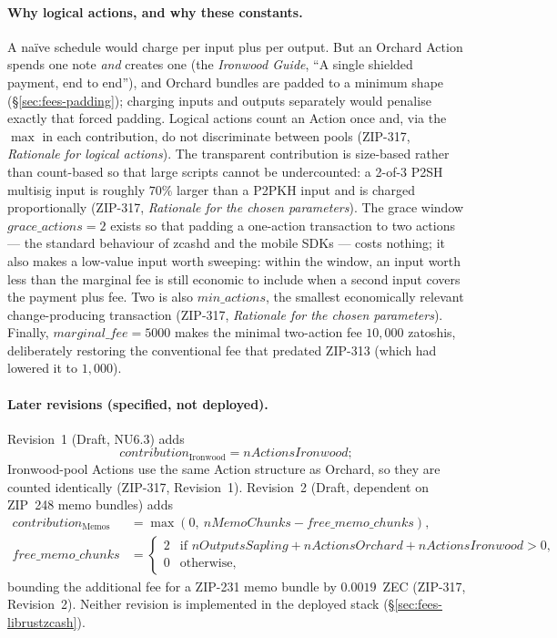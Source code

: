 \documentclass[11pt,a4paper]{article}
\theoremstyle{definition}
\begin{document}
\paragraph{Why logical actions, and why these constants.} A na\"ive
schedule would charge per input plus per output. But an Orchard Action
spends one note \emph{and} creates one (the \emph{Ironwood Guide}, ``A
single shielded payment, end to end''), and Orchard bundles are padded to a
minimum shape (\S\ref{sec:fees-padding}); charging inputs and outputs
separately would penalise exactly that forced padding. Logical actions
count an Action once and, via the $\max$ in each contribution, do not
discriminate between pools (ZIP-317, \emph{Rationale for logical actions}).
The transparent contribution is size-based rather than count-based so that
large scripts cannot be undercounted: a 2-of-3 P2SH multisig input is
roughly $70\%$ larger than a P2PKH input and is charged proportionally
(ZIP-317, \emph{Rationale for the chosen parameters}). The grace window
$\mathit{grace\_actions} = 2$ exists so that padding a one-action
transaction to two actions --- the standard behaviour of \textsf{zcashd}
and the mobile SDKs --- costs nothing; it also makes a low-value input
worth sweeping: within the window, an input worth less than the marginal
fee is still economic to include when a second input covers the payment
plus fee. Two is also $\mathit{min\_actions}$, the smallest economically
relevant change-producing transaction (ZIP-317, \emph{Rationale for the
chosen parameters}). Finally, $\mathit{marginal\_fee} = 5000$ makes the minimal
two-action fee $10{,}000$ zatoshis, deliberately restoring the conventional
fee that predated ZIP-313 (which had lowered it to $1{,}000$).

\paragraph{Later revisions (specified, not deployed).} Revision~1 (Draft,
NU6.3) adds
\[
\mathit{contribution}_{\mathrm{Ironwood}} = \mathit{nActionsIronwood};
\]
Ironwood-pool Actions use the same Action structure as Orchard, so they are
counted identically (ZIP-317, Revision~1). Revision~2 (Draft, dependent on
ZIP~248 memo bundles) adds
\begin{align*}
\mathit{contribution}_{\mathrm{Memos}} &=
  \max(0,\ \mathit{nMemoChunks} - \mathit{free\_memo\_chunks}),\\
\mathit{free\_memo\_chunks} &=
\begin{cases}
2 & \text{if } \mathit{nOutputsSapling} + \mathit{nActionsOrchard}
      + \mathit{nActionsIronwood} > 0,\\
0 & \text{otherwise},
\end{cases}
\end{align*}
bounding the additional fee for a ZIP-231 memo bundle by $0.0019$~ZEC
(ZIP-317, Revision~2). Neither revision is implemented in the deployed
stack (\S\ref{sec:fees-librustzcash}).
\end{document}
